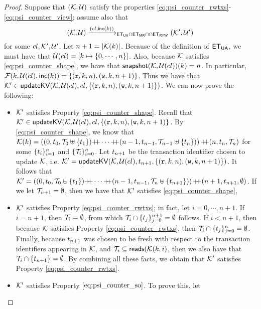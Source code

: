 \begin{proof}
Suppose that $(\mathcal{K}, \mathcal{U})$ satisfy the properties \eqref{eq:psi_counter_rwtxs}-\eqref{eq:psi_counter_view}; 
assume also that 
\[
(\mathcal{K}, \mathcal{U}) \xrightarrow{({cl}, \mathsf{inc}(k))}_{\mathsf{ET}_{\mathsf{UA}} \cap \mathsf{ET}_{\mathsf{MR}} \cap \cap \mathsf{ET}_{\mathsf{RYW}}} (\mathcal{K}', \mathcal{U}')
\]
for some ${cl}, \mathcal{K}', \mathcal{U}'$. Let $n+1 = \lvert \mathcal{K}(k) \rvert$. Because of the definition of 
$\mathsf{ET}_{\mathsf{UA}}$, we must have that $\mathcal{U}({cl}) = [k \mapsto \{0, \cdots, n\}]$. Also, 
because $\mathcal{K}$ satisfies \eqref{eq:psi_counter_shape}, we have that $\mathsf{snapshot}(\mathcal{K}, \mathcal{U}({cl}))(k) = n$. 
In particular, $\mathcal{F}(k, \mathcal{U}({cl}), \mathsf{inc}(k)) = \{(\textnormal{\texttt r}, k, n), (\textnormal{\texttt w}, k, n+1)\}$. 
Thus we have that $\mathcal{K}' \in \mathsf{updateKV}(\mathcal{K}, \mathcal{U}({cl}), {cl}, \{(\textnormal{\texttt r}, k, n), (\textnormal{\texttt w}, k, n+1)\})$. 
We can now prove the following: 
\begin{itemize}
\item $\mathcal{K}'$ satisfies Property \eqref{eq:psi_counter_shape}. 
Recall that $\mathcal{K}' \in \mathsf{updateKV}(\mathcal{K}, \mathcal{U}({cl}), {cl}, \{(\textnormal{\texttt r}, k, n), (\textnormal{\texttt w}, k, n+1)\}$. By \eqref{eq:psi_counter_shape}, 
we know that $\mathcal{K}(k) = \left( (0, t_{0}, \mathcal{T}_{0} \uplus \{t_1\}) \mathbb{+\!\!+} \cdots \mathbb{+\!\!+} (n-1, t_{n-1}, \mathcal{T}_{n-1} \uplus \{t_{n}\}) \right) 
\mathbb{+\!\!+} (n, t_{n}, \mathcal{T}_{n})$ 
for some $\{t_{i}\}_{i=1}^{n}$ and $\{\mathcal{T}_{i}\}_{i=0}^{n}$. Let $t_{n+1}$ be the transaction identifier 
chosen to update $\mathcal{K}$, i.e. $\mathcal{K}' = \mathsf{updateKV}(\mathcal{K}, \mathcal{U}({cl}), t_{n+1}, \{(\textnormal{\texttt r}, k, n), (\textnormal{\texttt w}, k, n+1)\})$. 
It follows that $\mathcal{K}' = \left( (0, t_{0}, \mathcal{T}_{0} \uplus \{t_1\}) \mathbb{+\!\!+} \cdots \mathbb{+\!\!+} (n-1, t_{n-1}, \mathcal{T}_{n} \uplus \{t_{n+1}\}) \right) 
\mathbb{+\!\!+} (n+1, t_{n+1}, \emptyset)$. If we let $\mathcal{T}_{n+1} = \emptyset$, then we have that $\mathcal{K}'$ satisfies \eqref{eq:psi_counter_shape}, 
\item $\mathcal{K}'$ satisfies Property \eqref{eq:psi_counter_rwtxs}; in fact, let $i =0, \cdots, n+1$. If $i = n+1$, then 
$\mathcal{T}_{i} = \emptyset$, from which $\mathcal{T}_{i} \cap \{t_{j}\}_{j=0}^{n+1} = \emptyset$ follows. If $i < n+1$, then 
because $\mathcal{K}$ satisfies Property \eqref{eq:psi_counter_rwtxs}, then $\mathcal{T}_{i} \cap \{t_{j}\}_{j=0}^{n} = \emptyset$. 
Finally, because $t_{n+1}$ was chosen to be fresh with respect to the transaction identifiers appearing in 
$\mathcal{K}$, and $\mathcal{T}_{i} \subseteq \mathsf{reads}(\mathcal{K}(k, i)$, then  we also have that $\mathcal{T}_{i} \cap \{t_{n+1}\} = \emptyset$. 
By combining all these facts, we obtain that $\mathcal{K}'$ satisfies Property \eqref{eq:psi_counter_rwtxs}.
\item $\mathcal{K}'$ satisfies Property $\eqref{eq:psi_counter_so}$. To prove this, let 

\end{itemize}
\end{proof}
